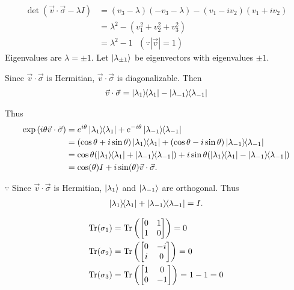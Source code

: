 \begin{align*}
	\det (\vec{v} \cdot \vec{\sigma}  - \lambda I) &= (v_3 - \lambda) (-v_3 - \lambda) - (v_1 - iv_2) (v_1 + iv_2)\\
			&= \lambda^2 - (v_1^2 + v_2^2  + v_3^2)\\
			&= \lambda^2 - 1 ~~~ (\because |\vec{v}| = 1)
\end{align*}
Eigenvalues are $\lambda = \pm 1$.
Let $\ket{\lambda_{ \pm 1 } }$ be eigenvectors with eigenvalues $\pm  1$.

Since $\vec{v} \cdot \vec{\sigma}$ is Hermitian,  $\vec{v} \cdot \vec{\sigma}$ is diagonalizable.
Then
\begin{align*}
	\vec{v} \cdot \vec{\sigma} = \ket{\lambda_1}\hspace{-1mm} \bra{\lambda_1} - \ket{\lambda_{-1}}\hspace{-1mm} \bra{\lambda_{-1}}
\end{align*}

Thus
\begin{align*}
	\exp \left(i \theta \vec{v} \cdot \vec{\sigma} \right) &=
	e^{i \theta} \kb{\lambda_1}  + e^{-i \theta} \kb{\lambda_{-1}}\\
	&= (\cos \theta + i \sin \theta) \kb{\lambda_1} + (\cos \theta - i \sin \theta) \kb{\lambda_{-1}}\\
	&= \cos \theta (\kb{\lambda_1} + \kb{\lambda_{-1}}) + i \sin \theta (\kb{\lambda_1} - \kb{\lambda_{-1}}) \\
	&= \cos( \theta) I + i \sin (\theta) \vec{v} \cdot \vec{\sigma}.
\end{align*}

$\because$ Since $\vec{v} \cdot \vec{\sigma}$ is Hermitian, $\ket{\lambda_1}$ and $\ket{\lambda_{-1}}$ are orthogonal.
Thus
\begin{align*}
	\ket{\lambda_1}\hspace{-1mm} \bra{\lambda_1} + \ket{\lambda_{-1}}\hspace{-1mm} \bra{\lambda_{-1}} = I.
\end{align*}


\begin{align*}
	\Tr (\sigma_1) &= \Tr \left(
		\begin{bmatrix}
		0 & 1 \\ 
		1 & 0
		\end{bmatrix}
	\right) = 0\\
%
	\Tr (\sigma_2) &= \Tr \left(
		\begin{bmatrix}
		0 & -i \\ 
		i & 0
		\end{bmatrix}
	\right) = 0\\
%
	\Tr (\sigma_3) &= \Tr \left(
	\begin{bmatrix}
		1 & 0 \\ 
		0 & -1
	\end{bmatrix}
	\right) = 1 -1 = 0\\
\end{align*}



